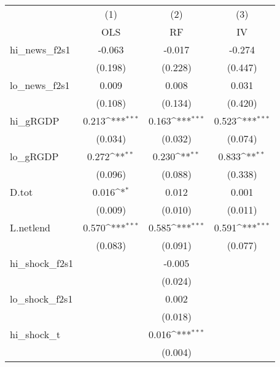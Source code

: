 {
\def\sym#1{\ifmmode^{#1}\else\(^{#1}\)\fi}
\begin{tabular}{l*{3}{c}}
\toprule
            &\multicolumn{1}{c}{(1)}&\multicolumn{1}{c}{(2)}&\multicolumn{1}{c}{(3)}\\
            &\multicolumn{1}{c}{OLS}&\multicolumn{1}{c}{RF}&\multicolumn{1}{c}{IV}\\
\midrule
hi\_news\_f2s1&      -0.063         &      -0.017         &      -0.274         \\
            &     (0.198)         &     (0.228)         &     (0.447)         \\
\addlinespace
lo\_news\_f2s1&       0.009         &       0.008         &       0.031         \\
            &     (0.108)         &     (0.134)         &     (0.420)         \\
\addlinespace
hi\_gRGDP    &       0.213\sym{***}&       0.163\sym{***}&       0.523\sym{***}\\
            &     (0.034)         &     (0.032)         &     (0.074)         \\
\addlinespace
lo\_gRGDP    &       0.272\sym{**} &       0.230\sym{**} &       0.833\sym{**} \\
            &     (0.096)         &     (0.088)         &     (0.338)         \\
\addlinespace
D.tot       &       0.016\sym{*}  &       0.012         &       0.001         \\
            &     (0.009)         &     (0.010)         &     (0.011)         \\
\addlinespace
L.netlend   &       0.570\sym{***}&       0.585\sym{***}&       0.591\sym{***}\\
            &     (0.083)         &     (0.091)         &     (0.077)         \\
\addlinespace
hi\_shock\_f2s1&                     &      -0.005         &                     \\
            &                     &     (0.024)         &                     \\
\addlinespace
lo\_shock\_f2s1&                     &       0.002         &                     \\
            &                     &     (0.018)         &                     \\
\addlinespace
hi\_shock\_t  &                     &       0.016\sym{***}&                     \\
            &                     &     (0.004)         &                     \\

\end{tabular}}
